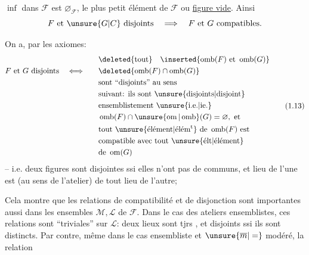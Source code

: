 $\inf$ dans $\mathcal{F}$ est $\varnothing_{\mathcal{F}}$, le plus petit élément de $\mathcal{F}$ ou \uline{figure vide}. Ainsi
\[
F\text{ et }\unsure{G|C}\text{ disjoints}\quad\Longrightarrow\quad F\text{ et }G\text{ compatibles}.
\]

On a, par les axiomes:
\[
\begin{aligned}
&&&\deleted{\text{tout}}\quad\inserted{\operatorname{omb}(F)\text{ et }\operatorname{omb}(G)}\\
 F\text{ et }G\text{ disjoints}&\quad\Longleftrightarrow\quad&&\deleted{\operatorname{omb}(F)\cap\operatorname{omb}(G)}\\
&&&\text{sont ``disjoints'' au sens}\\
&&&\text{suivant: ils sont \unsure{disjoints|disjoint}}\\
&&&\text{ensemblistement \unsure{i.e.|ie.}}\\
&&&\operatorname{omb}(F)\cap\unsure{\operatorname{om}|\operatorname{omb}}(G)=\varnothing,\ \text{et}\\
&&&\text{tout \unsure{élément|élém\textsuperscript{t}} de }\operatorname{omb}(F)\text{ est}\\
&&&\text{compatible avec tout \unsure{élt|élément}}\\
&&&\text{de }\operatorname{om}(G)
\end{aligned}\tag*{(1.13)}
\]
-- i.e. deux figures sont disjointes ssi elles n'ont pas de  communs, et  lieu de l'une est    (au sens de  l'atelier) de tout lieu de l'autre;

Cela montre que les relations de compatibilité et de disjonction sont importantes aussi dans les  ensembles $\mathcal{M},\mathcal{L}$ de $\mathcal{F}$. Dans le cas des ateliers ensemblistes, ces relations sont ``triviales'' sur $\mathcal{L}$: deux lieux sont tjrs  , et disjoints ssi ils sont distincts. Par contre, même dans le cas ensembliste et $\unsure{\overline m|=}$ modéré, la relation
